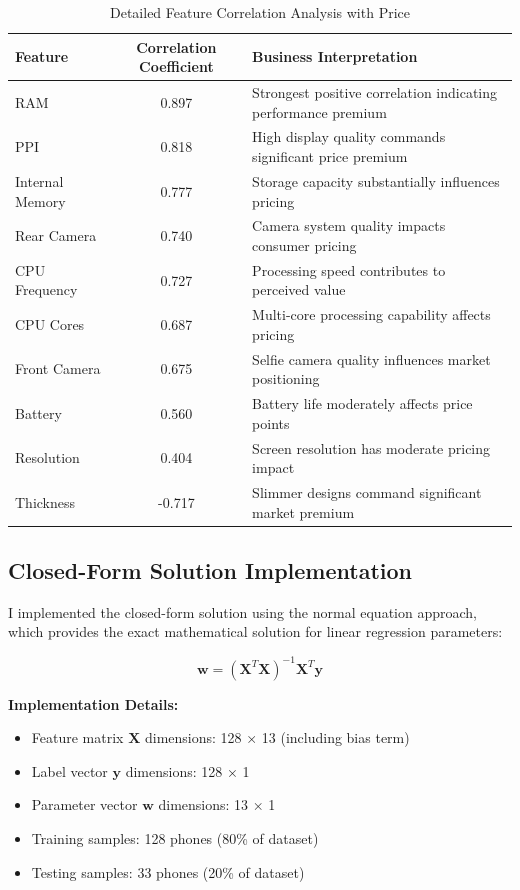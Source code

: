 \documentclass[12pt,a4paper]{article}
\begin{document}
\begin{table}[H]
\centering
\caption{Detailed Feature Correlation Analysis with Price}
\begin{tabular}{lcl}
\toprule
\textbf{Feature} & \textbf{Correlation Coefficient} & \textbf{Business Interpretation} \\
\midrule
RAM & 0.897 & Strongest positive correlation indicating performance premium \\
PPI & 0.818 & High display quality commands significant price premium \\
Internal Memory & 0.777 & Storage capacity substantially influences pricing \\
Rear Camera & 0.740 & Camera system quality impacts consumer pricing \\
CPU Frequency & 0.727 & Processing speed contributes to perceived value \\
CPU Cores & 0.687 & Multi-core processing capability affects pricing \\
Front Camera & 0.675 & Selfie camera quality influences market positioning \\
Battery & 0.560 & Battery life moderately affects price points \\
Resolution & 0.404 & Screen resolution has moderate pricing impact \\
Thickness & -0.717 & Slimmer designs command significant market premium \\
\bottomrule
\end{tabular}
\end{table}

\subsection{Closed-Form Solution Implementation}
I implemented the closed-form solution using the normal equation approach, which provides the exact mathematical solution for linear regression parameters:

\begin{equation}
\mathbf{w} = (\mathbf{X}^T\mathbf{X})^{-1}\mathbf{X}^T\mathbf{y}
\end{equation}

\textbf{Implementation Details:}
\begin{itemize}
\item Feature matrix $\mathbf{X}$ dimensions: 128 × 13 (including bias term)
\item Label vector $\mathbf{y}$ dimensions: 128 × 1
\item Parameter vector $\mathbf{w}$ dimensions: 13 × 1
\item Training samples: 128 phones (80\% of dataset)
\item Testing samples: 33 phones (20\% of dataset)
\end{itemize}
\end{document}
